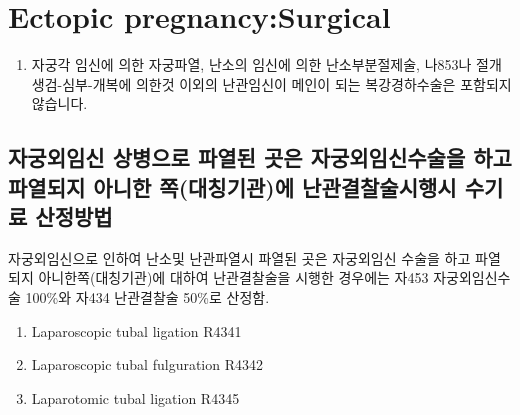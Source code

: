\section{Ectopic pregnancy:Surgical}
%
{\begin{enumerate}[1.]\tightlist
\item 자궁각 임신에 의한 자궁파열, 난소의 임신에 의한 난소부분절제술, 나853나 절개생검-심부-개복에 의한것 이외의 난관임신이 메인이 되는 복강경하수술은 포함되지 않습니다.
\end{enumerate}}
\prezi{\clearpage}
\subsection{자궁외임신 상병으로 파열된 곳은 자궁외임신수술을 하고 파열되지 아니한 쪽(대칭기관)에 난관결찰술시행시 수기료 산정방법}
자궁외임신으로 인하여 난소및 난관파열시 파열된 곳은 자궁외임신 수술을 하고 파열되지 아니한쪽(대칭기관)에 대하여 난관결찰술을 시행한 경우에는 자453 자궁외임신수술 100\%와 자434 난관결찰술 50\%로 산정함.
\begin{enumerate}\tightlist
\item Laparoscopic tubal ligation R4341 
\item Laparoscopic tubal fulguration R4342 
\item Laparotomic tubal ligation R4345 
\end{enumerate}

\prezi{\clearpage}
